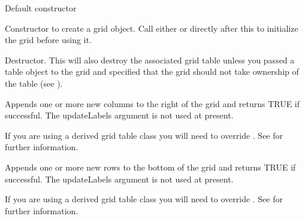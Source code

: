
Default constructor


Constructor to create a grid object. Call either  or 
 directly after this to initialize the grid before using
it. 

\label{wxgriddtor}


Destructor. This will also destroy the associated grid table unless you passed a table
object to the grid and specified that the grid should not take ownership of the
table (see ). 

\label{wxgridappendcols}


Appends one or more new columns to the right of the grid and returns TRUE if
successful. The updateLabels argument is not used at present.

If you are using a derived grid table class you will need to override 
. See 
 for further information. 

\label{wxgridappendrows}


Appends one or more new rows to the bottom of the grid and returns TRUE if
successful. The updateLabels argument is not used at present.

If you are using a derived grid table class you will need to override 
. See 
 for further information. 

\label{wxgridautosize}


